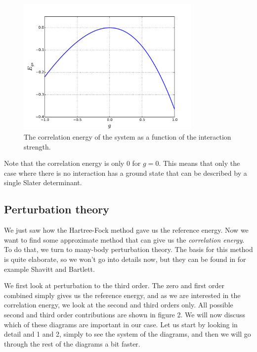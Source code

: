 \documentclass[a4paper, 11pt, notitlepage, english]{article}
\begin{document}
\begin{figure}[htbp]
\centering 
\includegraphics[width=0.8\textwidth]{proj2_correlation}
\caption{The correlation energy of the system as a function of the interaction strength. \label{fig:correlation_energy}}
\end{figure}

Note that the correlation energy is only $0$ for $g=0$. This means that only the case where there is no interaction has a ground state that can be described by a single Slater determinant.

\subsection*{Perturbation theory}

We just saw how the Hartree-Fock method gave us the reference energy. Now we want to find some approximate method that can give us the \emph{correlation energy}. To do that, we turn to many-body perturbation theory. The basis for this method is quite elaborate, so we won't go into details now, but they can be found in for example Shavitt and Bartlett.

We first look at perturbation to the third order. The zero and first order combined simply gives us the reference energy, and as we are interested in the correlation energy, we look at the second and third orders only. All possible second and third order contributions are shown in figure 2. We will now discuss which of these diagrams are important in our case. Let us start by looking in detail and 1 and 2, simply to see the system of the diagrams, and then we will go through the rest of the diagrams a bit faster.
\end{document}
